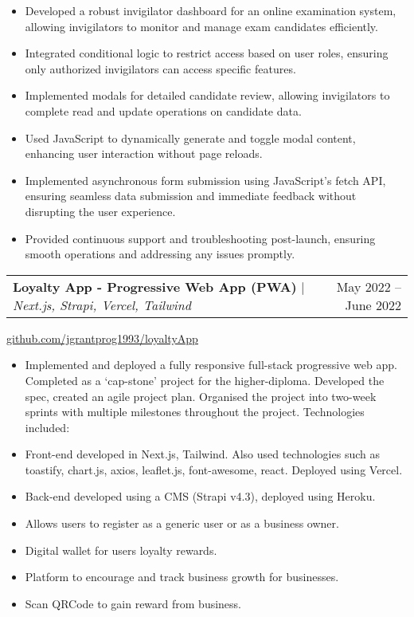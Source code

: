 \documentclass[letterpaper,11pt]{article}
\makeatletter
\newcommand{\resumeItem}[1]{
  \item\small{
    {#1 \vspace{-2pt}}
  }
}
\newcommand{\resumeProjectHeading}[2]{
    \item
    \begin{tabular*}{0.97\textwidth}{l@{\extracolsep{\fill}}r}
      \small#1 & #2 \\
    \end{tabular*}\vspace{-7pt}
}
\newcommand{\resumeItemListStart}{\begin{itemize}}
\newcommand{\resumeItemListEnd}{\end{itemize}\vspace{-5pt}}
\makeatother
\begin{document}
          \resumeItemListStart
            \resumeItem{Developed a robust invigilator dashboard for an online examination system, allowing invigilators to monitor and manage exam candidates efficiently.}
            \resumeItem{Integrated conditional logic to restrict access based on user roles, ensuring only authorized invigilators can access specific features.}
            \resumeItem{Implemented modals for detailed candidate review, allowing invigilators to complete read and update operations on candidate data.}
            \resumeItem{Used JavaScript to dynamically generate and toggle modal content, enhancing user interaction without page reloads.}
            \resumeItem{Implemented asynchronous form submission using JavaScript's fetch API, ensuring seamless data submission and immediate feedback without disrupting the user experience.}
            \resumeItem{Provided continuous support and troubleshooting post-launch, ensuring smooth operations and addressing any issues promptly.}
          \resumeItemListEnd
          
      \resumeProjectHeading
          {\textbf{Loyalty App - Progressive Web App (PWA)} $|$ \emph{Next.js, Strapi, Vercel, Tailwind}}{May 2022 -- June 2022}
          \begin{center}
                 \href{https://github.com/jgrantprog1993/project_loyaltyApp}{\underline{github.com/jgrantprog1993/loyaltyApp}} 
            \end{center}
            
          \resumeItemListStart
            \resumeItem{Implemented and deployed a fully responsive full-stack progressive web app. Completed as a ‘cap-stone’ project for the higher-diploma. Developed the spec, created an agile                   project plan. Organised the project into two-week sprints with multiple milestones throughout the project. Technologies included:}
            \resumeItem{Front-end developed in Next.js, Tailwind. Also used technologies such as toastify, chart.js, axios, leaflet.js, font-awesome, react. Deployed using Vercel.}
            \resumeItem{Back-end developed using a CMS (Strapi v4.3), deployed using Heroku.}
            \resumeItem{Allows users to register as a generic user or as a business owner.}
            \resumeItem{Digital wallet for users loyalty rewards.}
            \resumeItem{Platform to encourage and track business growth for businesses.}
            \resumeItem{Scan QRCode to gain reward from business.}
          
          \resumeItemListEnd
          
\end{document}
